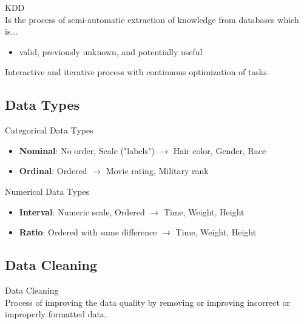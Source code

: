 \begin{definition}{KDD}\\
Is the process of semi-automatic extraction of knowledge from databases which is...
\begin{itemize}
    \item valid, previously unknown, and potentially useful
\end{itemize}
Interactive and iterative process with continuous optimization of tasks.
\end{definition}


\subsection{Data Types}

\begin{definition}{Categorical Data Types}
\begin{itemize}
    \item \textbf{Nominal}: No order, Scale ("labels") $\rightarrow$ Hair color, Gender, Race
    \item \textbf{Ordinal}: Ordered $\rightarrow$ Movie rating, Military rank
\end{itemize}
\end{definition}

\begin{definition}{Numerical Data Types}
\begin{itemize}
    \item \textbf{Interval}: Numeric scale, Ordered $\rightarrow$ Time, Weight, Height
    \item \textbf{Ratio}: Ordered with same difference $\rightarrow$ Time, Weight, Height
\end{itemize}
\end{definition}

\subsection{Data Cleaning}

\begin{concept}{Data Cleaning}\\
Process of improving the data quality by removing or improving incorrect or improperly formatted data.
\end{concept}

